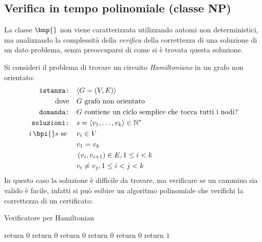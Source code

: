 \subsection{Verifica in tempo polinomiale (classe NP)}

La classe $\bnp{}$ non viene caratterizzata utilizzando automi non deterministici, ma analizzando la complessità della \emph{verifica} della correttezza di una soluzione di un dato problema, senza preoccuparsi di come si è trovata questa soluzione.

Si consideri il problema di trovare un circuito \emph{Hamiltoniano} in un grafo non orientato:
\begin{align*}
    \texttt{istanza:} \quad & \langle G=(V,E) \rangle \\
    \text{dove} \quad & G \text{ grafo non orientato} \\
    \texttt{domanda:} \quad & G \text{ contiene un ciclo semplice che tocca tutti i nodi?} \\
    \texttt{soluzioni:} \quad & s=\langle v_1, \dots, v_k \rangle \in \mathbb{N}^* \\
    i \, \bpi{} s \text{ se } \quad & 
    v_i \in V \\
    & v_1 = v_k \\
    & \left( v_i, v_{i+1} \right) \in E, 1 \leq i < k \\
    & v_i \neq v_j , 1 \leq i < j < k
\end{align*}
In questo caso la soluzione è difficile da trovare, ma verificare se un cammino sia valido è facile, infatti si può esibire un algoritmo polinomiale che verifichi la correttezza di un certificato:
\begin{algorithm}[H]
\caption{Verificatore per Hamiltonian}\label{alg:verifyh}
\begin{algorithmic}[1]
            \State return $0$
        \EndIf
            \State return $0$
        \EndIf
            \State return $0$
        \EndIf
            \State return $0$
        \EndIf
                \State return $0$
            \EndIf
        \EndFor
        \State return $1$
    \EndProcedure
\end{algorithmic}
\end{algorithm}

